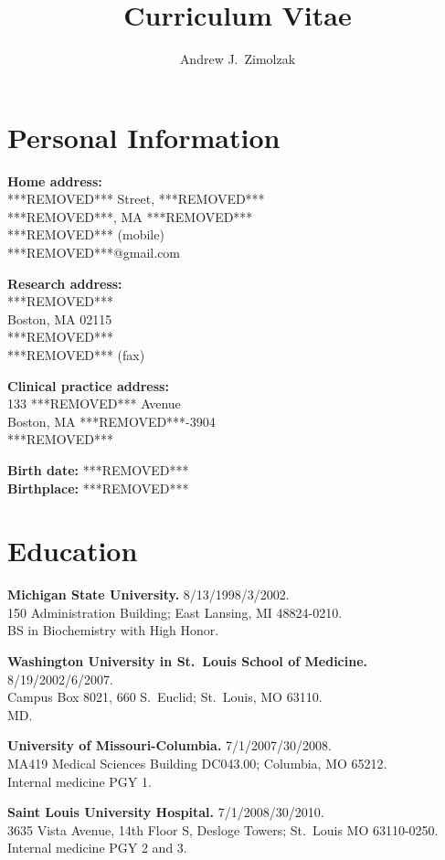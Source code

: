 \documentclass[12pt]{article}
\title{Curriculum Vitae}
\author{Andrew J.\ Zimolzak}
\begin{document}
\maketitle

\section{Personal Information}

\textbf{Home address:}\\
***REMOVED*** Street, ***REMOVED***\\
***REMOVED***, MA ***REMOVED***\\
***REMOVED*** (mobile)\\
***REMOVED***@gmail.com

\textbf{Research address:}\\
***REMOVED***\\
Boston, MA 02115\\
***REMOVED***\\
***REMOVED*** (fax)

\textbf{Clinical practice address:}\\
133 ***REMOVED*** Avenue\\
Boston, MA ***REMOVED***-3904\\
***REMOVED***

\textbf{Birth date:} ***REMOVED***\\
\textbf{Birthplace:} ***REMOVED***

\section{Education}

\textbf{Michigan State University.} 8/13/1998/3/2002.\\
150 Administration Building; East Lansing, MI 48824-0210.\\
BS in Biochemistry with High Honor.

\textbf{Washington University in St.\ Louis School of Medicine.}
8/19/2002/6/2007.\\
Campus Box 8021, 660 S.\ Euclid; St.\ Louis, MO 63110.\\
MD.

\textbf{University of Missouri-Columbia.} 7/1/2007/30/2008.\\
MA419 Medical Sciences Building DC043.00; Columbia, MO 65212.\\
Internal medicine PGY 1.

\textbf{Saint Louis University Hospital.} 7/1/2008/30/2010.\\
3635 Vista Avenue, 14th Floor S, Desloge Towers; St.\ Louis MO
63110-0250.\\
Internal medicine PGY 2 and 3.
\end{document}
